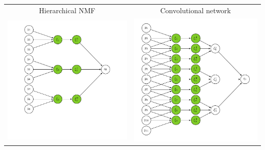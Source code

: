 \documentclass[landscape,footrule]{foils}
\begin{document}

\begin{tabular}{cc}
Hierarchical NMF & Convolutional network\\

\includegraphics[scale=0.7]{hierarchical-nmf}
&\includegraphics[scale=0.7]{convolutional-network}\\
\end{tabular}
\end{document}
